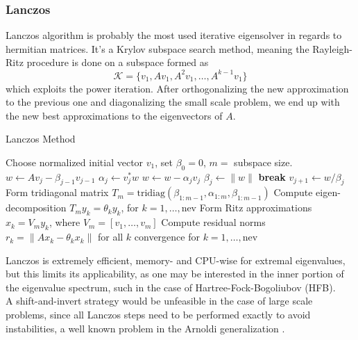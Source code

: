\subsubsection{Lanczos}
Lanczos algorithm \cite{lanczos1952solution} is probably the most used iterative eigensolver in regards to hermitian matrices. It's a Krylov subspace search method, meaning the Rayleigh-Ritz procedure is done on a subspace formed as 
\begin{equation}
    \mathcal K = \{ v_1, Av_1, A^2 v_1, \ldots, A^{k-1} v_1 \}
\end{equation}
which exploits the power iteration. After orthogonalizing the new approximation to the previous one and diagonalizing the small scale problem, we end up with the new best approximations to the eigenvectors of $A$.
\begin{algorithm}[H]
\caption{Lanczos Method}
\begin{algorithmic}[1]
\STATE Choose normalized initial vector $v_1$, set $\beta_0 = 0$, $m=$ subspace size.
\REPEAT
{}
    \STATE $w \gets A v_j - \beta_{j-1} v_{j-1}$
    \STATE $\alpha_j \gets v_j^* w$
    \STATE $w \gets w - \alpha_j v_j$
    \STATE $\beta_j \gets \|w\|$
        \STATE \textbf{break}
    \ENDIF
    \STATE $v_{j+1} \gets w / \beta_j$
\ENDFOR
\STATE Form tridiagonal matrix 
       $T_m = \mathrm{tridiag}(\beta_{1:m-1}, \alpha_{1:m}, \beta_{1:m-1})$
\STATE Compute eigen-decomposition $T_m y_k = \theta_k y_k$, 
       for $k = 1, \dots, \text{nev}$
\STATE Form Ritz approximations 
       $x_k = V_m y_k$, where $V_m = [v_1, \dots, v_m]$
\STATE Compute residual norms 
       $r_k = \|A x_k - \theta_k x_k\|$ for all $k$
\UNTIL convergence for $k = 1, \dots, \text{nev}$
\end{algorithmic}
\end{algorithm}
Lanczos is extremely efficient, memory- and CPU-wise for extremal eigenvalues, but this limits its applicability, as one may be interested in the inner portion of the eigenvalue spectrum, such in the case of Hartree-Fock-Bogoliubov (HFB).
\\A shift-and-invert strategy would be unfeasible in the case of large scale problems, since all Lanczos steps need to be performed exactly to avoid instabilities, a well known problem in the Arnoldi generalization \cite{Saad1992}.
